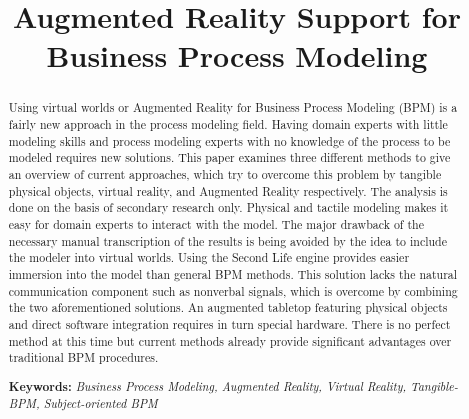 \documentclass[12pt]{llncs} %
\begin{document}
\vspace{1cm}
\begin{abstract}
Using virtual worlds or Augmented Reality for Business Process Modeling (BPM) is a fairly new approach 
in the process modeling field. Having domain experts with little modeling skills and process modeling
experts with no knowledge of the process to be modeled requires new solutions. This paper examines three
different methods to give an overview of current approaches, which try to overcome this problem by
tangible physical objects, virtual reality, and Augmented Reality respectively. The analysis is done
on the basis of secondary research only. Physical and tactile modeling makes it easy for domain experts 
to interact with the model. The major drawback of the necessary manual transcription of the results is 
being avoided by the idea to include the modeler into virtual worlds. Using the Second Life engine provides
easier immersion into the model than general BPM methods. This solution lacks the natural communication
component such as nonverbal signals, which is overcome by combining the two aforementioned solutions. 
An augmented tabletop featuring physical objects and direct software integration requires in turn special
hardware. There is no perfect method at this time but current methods already provide significant advantages
over traditional BPM procedures.\\
\vspace{1cm}
 
\textbf{Keywords: }
\textit{Business Process Modeling, Augmented Reality, Virtual Reality,
Tangible-BPM, Subject-oriented BPM}
\end{abstract}

%
%
\mainmatter              %
%
\title{Augmented Reality Support for Business Process Modeling}
%



\clearpage




\printindex



\clearpage


\end{document}
